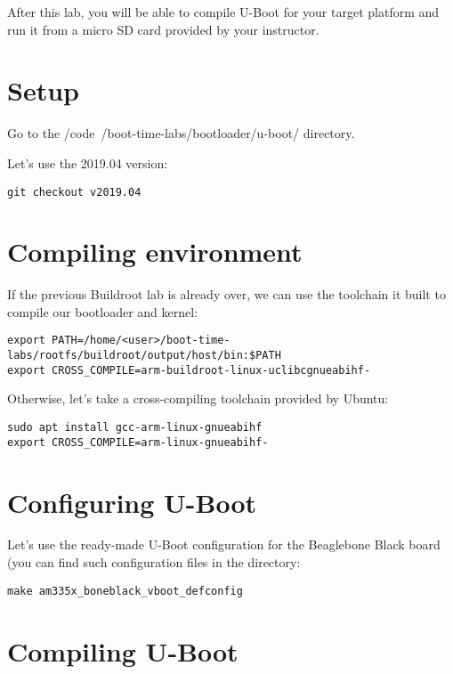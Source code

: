 
After this lab, you will be able to compile U-Boot for your target
platform and run it from a micro SD card provided by your instructor.

\section{Setup}

Go to the /code{~/boot-time-labs/bootloader/u-boot/} directory.

Let's use the 2019.04 version:
\begin{verbatim}
git checkout v2019.04
\end{verbatim}

\section{Compiling environment}

If the previous Buildroot lab is already over, we can use the
toolchain it built to compile our bootloader and kernel:

\begin{verbatim}
export PATH=/home/<user>/boot-time-labs/rootfs/buildroot/output/host/bin:$PATH
export CROSS_COMPILE=arm-buildroot-linux-uclibcgnueabihf-
\end{verbatim}

Otherwise, let's take a cross-compiling toolchain provided by Ubuntu:

\begin{verbatim}
sudo apt install gcc-arm-linux-gnueabihf
export CROSS_COMPILE=arm-linux-gnueabihf-
\end{verbatim}

\section{Configuring U-Boot}

Let's use the ready-made U-Boot configuration for the Beaglebone Black
board (you can find such configuration files in the 
directory:

\begin{verbatim}
make am335x_boneblack_vboot_defconfig
\end{verbatim}

\section{Compiling U-Boot}

